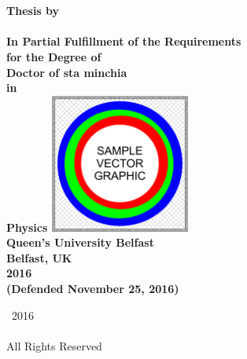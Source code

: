 

\thispagestyle{empty}

\begingroup
\centering
{}
~
\\[1em]
\sffamily\bfseries\fontsize{26}{31.2}\selectfont
\DocumentTitle
\\[0.4in]
\normalfont\large
Thesis by
\\[0.25em]
\sffamily\bfseries\Large
\AuthorName
\\[0.4in]
\normalfont\normalsize
In Partial Fulfillment of the Requirements
\\[0.5em]
for the Degree of
\\[0.5em]
Doctor of sta minchia
\\[0.5em]
in
\\[0.5em]
Physics
\vfill
\includegraphics[height=1.8in]
{Figure-SchoolLogo}
\\[1.5em]
Queen's University Belfast
\\[0.5em]
Belfast, UK
\\[1.5em]
2016
\\[0.5em]
(Defended November 25, 2016)
\par
\endgroup

\clearpage


\pagestyle{plain}
\setcounter{page}{2}

\begingroup
\centering
{}
\null
\vfill
{\sffamily\textcopyright}~2016
\\[0.5em]
\AuthorName
\\[0.5em]
All Rights Reserved
\par
\endgroup

